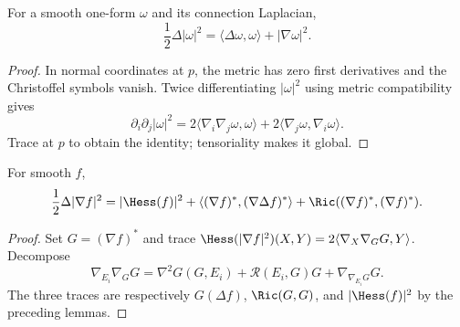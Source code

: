 \begin{lemma}
\label{lem:laplacian-square-norm-one-form}

For a smooth one-form $\omega$ and its connection Laplacian,
$$\frac12\Delta|\omega|^2
=\langle\Delta\omega,\omega\rangle+|\nabla\omega|^2.$$
\end{lemma}
\begin{proof}
\sketch
{}
In normal coordinates at $p$, the metric has zero first derivatives and
the Christoffel symbols vanish. Twice differentiating
$|\omega|^2$ using metric compatibility gives
$$\partial_i\partial_j|\omega|^2
=2\langle\nabla_i\nabla_j\omega,\omega\rangle
+2\langle\nabla_j\omega,\nabla_i\omega\rangle.$$
Trace at $p$ to obtain the identity; tensoriality makes it global.
\end{proof}

\begin{lemma}
\label{lem:function-bochner-formula}
\leanok



For smooth $f$,
$$\frac12\Delta|\nabla f|^2
=|\Hess(f)|^2
+\langle(\nabla f)^*,(\nabla\Delta f)^*\rangle
+\Ric((\nabla f)^*,(\nabla f)^*).$$
\end{lemma}
\begin{proof}
\sketch
{}
\leanok
Set $G=(\nabla f)^*$ and trace
$\Hess(|\nabla f|^2)(X,Y)=2\langle\nabla_X\nabla_GG,Y\rangle$.
Decompose
$$\nabla_{E_i}\nabla_GG
=\nabla^2G(G,E_i)+\mathcal R(E_i,G)G
+\nabla_{\nabla_{E_i}G}G.$$
The three traces are respectively
$G(\Delta f)$, $\Ric(G,G)$, and $|\Hess(f)|^2$ by the preceding
lemmas.
\end{proof}

